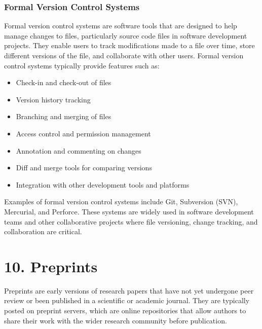 \documentclass[
  letterpaper,
  DIV=11,
  numbers=noendperiod]{scrreprt}
\begin{document}
\hypertarget{formal-version-control-systems}{%
\subsection*{\texorpdfstring{\textbf{Formal Version Control
Systems}}{Formal Version Control Systems}}\label{formal-version-control-systems}}

Formal version control systems are software tools that are designed to
help manage changes to files, particularly source code files in software
development projects. They enable users to track modifications made to a
file over time, store different versions of the file, and collaborate
with other users. Formal version control systems typically provide
features such as:

\begin{itemize}
\item
  Check-in and check-out of files
\item
  Version history tracking
\item
  Branching and merging of files
\item
  Access control and permission management
\item
  Annotation and commenting on changes
\item
  Diff and merge tools for comparing versions
\item
  Integration with other development tools and platforms
\end{itemize}

Examples of formal version control systems include Git, Subversion
(SVN), Mercurial, and Perforce. These systems are widely used in
software development teams and other collaborative projects where file
versioning, change tracking, and collaboration are critical.


\hypertarget{preprints-1}{%
\chapter*{10. Preprints}\label{preprints-1}}


Preprints are early versions of research papers that have not yet
undergone peer review or been published in a scientific or academic
journal. They are typically posted on preprint servers, which are online
repositories that allow authors to share their work with the wider
research community before publication.
\end{document}
